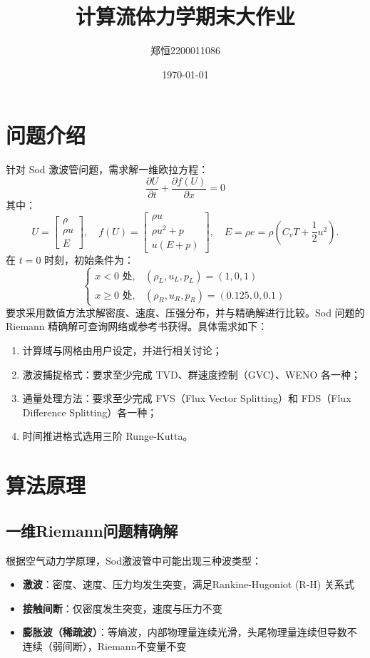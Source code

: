 \documentclass[12pt,a4paper]{article}
\title{计算流体力学期末大作业}
\author{郑恒2200011086}
\date{\today}
\begin{document}
\maketitle

\section{问题介绍}
针对 Sod 激波管问题，需求解一维欧拉方程：
$$
\frac{\partial U}{\partial t} + \frac{\partial f(U)}{\partial x} = 0
$$
其中：
$$
U = \begin{bmatrix} \rho \\ \rho u \\ E \end{bmatrix}, \quad f(U) = \begin{bmatrix} \rho u \\ \rho u^{2} + p \\ u(E + p) \end{bmatrix}, \quad E = \rho e = \rho \left( C_{v} T + \frac{1}{2} u^{2} \right).
$$
在 $t = 0$ 时刻，初始条件为：
$$
\begin{cases}
x < 0\text{ 处}, & (\rho_{L}, u_{L}, p_{L}) = (1, 0, 1) \\
x \geq 0\text{ 处}, & (\rho_{R}, u_{R}, p_{R}) = (0.125, 0, 0.1)
\end{cases}
$$
要求采用数值方法求解密度、速度、压强分布，并与精确解进行比较。Sod 问题的 Riemann 精确解可查询网络或参考书获得。具体需求如下：
\begin{enumerate}
  \item 计算域与网格由用户设定，并进行相关讨论；
  \item 激波捕捉格式：要求至少完成 TVD、群速度控制（GVC）、WENO 各一种；
  \item 通量处理方法：要求至少完成 FVS（Flux Vector Splitting）和 FDS（Flux Difference Splitting）各一种；
  \item 时间推进格式选用三阶 Runge-Kutta。
\end{enumerate}
\section{算法原理}
\subsection{一维Riemann问题精确解}
根据空气动力学原理，Sod激波管中可能出现三种波类型：
\begin{itemize}
  \item \textbf{激波}：密度、速度、压力均发生突变，满足Rankine-Hugoniot (R-H) 关系式
  \item \textbf{接触间断}：仅密度发生突变，速度与压力不变
  \item \textbf{膨胀波（稀疏波）}：等熵波，内部物理量连续光滑，头尾物理量连续但导数不连续（弱间断），Riemann不变量不变
\end{itemize}
\end{document}
